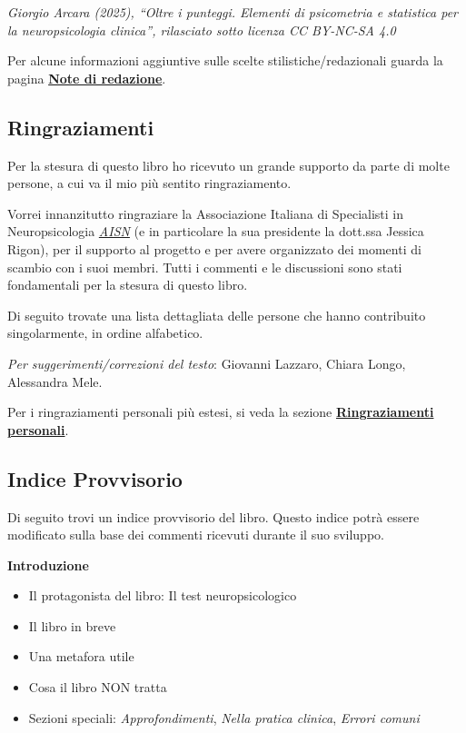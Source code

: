 \documentclass[
  italian,
  letterpaper,
  paper=6in:9in,
  pagesize=pdftex,
  headinclude=on,
  footinclude=on,
  11pt]{scrbook}
\providecommand{\tightlist}{%
  \setlength{\itemsep}{0pt}\setlength{\parskip}{0pt}}
\begin{document}
\emph{Giorgio Arcara (2025), ``Oltre i punteggi. Elementi di psicometria
e statistica per la neuropsicologia clinica'', rilasciato sotto licenza
CC BY-NC-SA 4.0}

Per alcune informazioni aggiuntive sulle scelte stilistiche/redazionali
guarda la pagina \hyperref[note_redazione]{\textbf{Note di redazione}}.

\subsection*{Ringraziamenti}\label{ringraziamenti}

Per la stesura di questo libro ho ricevuto un grande supporto da parte
di molte persone, a cui va il mio più sentito ringraziamento.

Vorrei innanzitutto ringraziare la Associazione Italiana di Specialisti
in Neuropsicologia \href{https://aisn.pro/}{\emph{AISN}} (e in
particolare la sua presidente la dott.ssa Jessica Rigon), per il
supporto al progetto e per avere organizzato dei momenti di scambio con
i suoi membri. Tutti i commenti e le discussioni sono stati fondamentali
per la stesura di questo libro.

Di seguito trovate una lista dettagliata delle persone che hanno
contribuito singolarmente, in ordine alfabetico.

\emph{Per suggerimenti/correzioni del testo}: Giovanni Lazzaro, Chiara
Longo, Alessandra Mele.

Per i ringraziamenti personali più estesi, si veda la sezione
\hyperref[ringraziamenti_personali]{\textbf{Ringraziamenti personali}}.

\vspace{2em}

\subsection*{Indice Provvisorio}\label{indice-provvisorio}

Di seguito trovi un indice provvisorio del libro. Questo indice potrà
essere modificato sulla base dei commenti ricevuti durante il suo
sviluppo.

\textbf{Introduzione}

\begin{itemize}
\tightlist
\item
  Il protagonista del libro: Il test neuropsicologico
\item
  Il libro in breve
\item
  Una metafora utile
\item
  Cosa il libro NON tratta
\item
  Sezioni speciali: \emph{Approfondimenti}, \emph{Nella pratica
  clinica}, \emph{Errori comuni}
\end{itemize}
\end{document}
